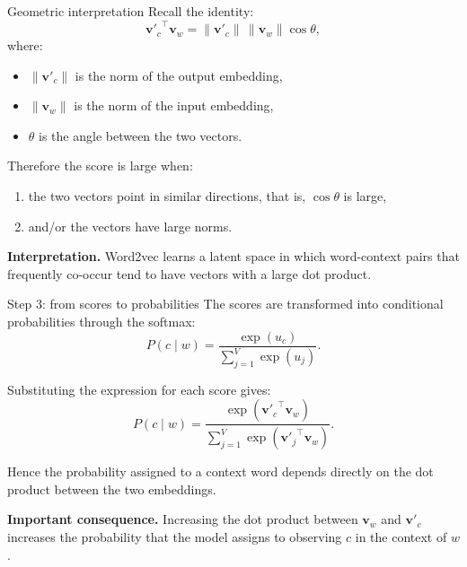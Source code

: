 \documentclass[11pt,aspectratio=169,professionalfonts]{beamer}
\begin{document}
\begin{frame}{Geometric interpretation}
Recall the identity:
\[
{\bm{v}'_c}^\top \bm{v}_w = \lVert \bm{v}'_c \rVert \, \lVert \bm{v}_w \rVert \cos \theta,
\]
where:
\begin{itemize}
    \item $\lVert \bm{v}'_c \rVert$ is the norm of the output embedding,
    \item $\lVert \bm{v}_w \rVert$ is the norm of the input embedding,
    \item $\theta$ is the angle between the two vectors.
\end{itemize}

\vspace{0.3cm}

Therefore the score is large when:
\begin{enumerate}
    \item the two vectors point in similar directions, that is, $\cos \theta$ is large,
    \item and/or the vectors have large norms.
\end{enumerate}

\textbf{Interpretation.} Word2vec learns a latent space in which word-context pairs that frequently co-occur tend to have vectors with a large dot product.
\end{frame}
%
%
\begin{frame}{Step 3: from scores to probabilities}
The scores are transformed into conditional probabilities through the softmax:
\[
P(c \mid w) = \frac{\exp(u_c)}{\sum_{j=1}^{V} \exp(u_j)}.
\]

Substituting the expression for each score gives:
\[
P(c \mid w) = \frac{\exp\!\left({\bm{v}'_c}^\top \bm{v}_w\right)}{\sum_{j=1}^{V} \exp\!\left({\bm{v}'_j}^\top \bm{v}_w\right)}.
\]

Hence the probability assigned to a context word depends directly on the dot product between the two embeddings.

\textbf{Important consequence.} Increasing the dot product between $\bm{v}_w$ and $\bm{v}'_c$ increases the probability that the model assigns to observing $c$ in the context of $w$.
\end{frame}
%
%
\end{document}

